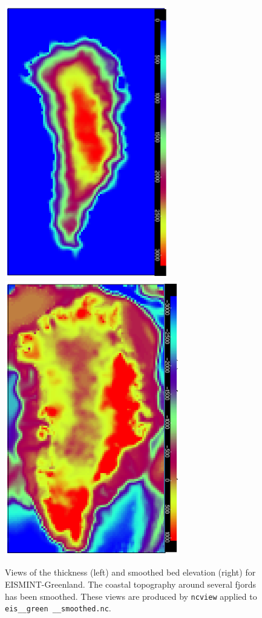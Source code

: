 \documentclass[11pt,final]{amsart}
\newcommand{\und}{\_\!\_}
\begin{document}
\begin{figure}[ht]
\includegraphics[width=2.8in,keepaspectratio=true]{figs/EISgreen_thick}\qquad\includegraphics[width=3.0in,keepaspectratio=true]{figs/EISgreen_bed}
\caption{Views of the thickness (left) and smoothed bed elevation (right) for EISMINT-Greenland.  The coastal topography around several fjords has been smoothed.  These views are produced by \texttt{ncview} applied to \texttt{eis\und green \und smoothed.nc}.}
\label{fig:greendata}
\end{figure}
\end{document}
